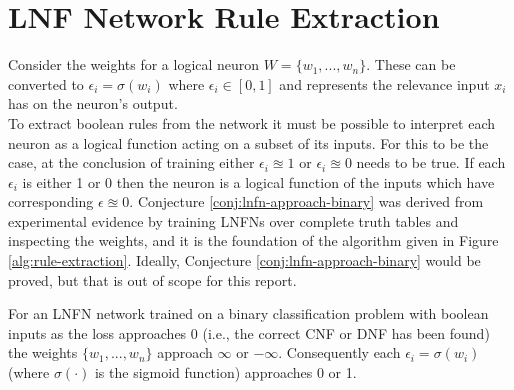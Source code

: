 \section{LNF Network Rule Extraction} \label{sec:lnfn-rule-extraction}
Consider the weights for a logical neuron $W = \{w_1, ..., w_n\}$. These can be converted to $\epsilon_i = \sigma(w_i)$ where $\epsilon_i \in [0, 1]$ and represents the relevance input $x_i$ has on the neuron's output.\\

To extract boolean rules from the network it must be possible to interpret each neuron as a logical function acting on a subset of its inputs. For this to be the case, at the conclusion of training either $\epsilon_i \approxeq 1$ or $\epsilon_i \approxeq 0$ needs to be true. If each $\epsilon_i$ is either 1 or 0 then the neuron is a logical function of the inputs which have corresponding $\epsilon \approxeq 0$. Conjecture \ref{conj:lnfn-approach-binary} was derived from experimental evidence by training LNFNs over complete truth tables and inspecting the weights, and it is the foundation of the algorithm given in Figure \ref{alg:rule-extraction}. Ideally, Conjecture \ref{conj:lnfn-approach-binary} would be proved, but that is out of scope for this report.

\begin{conjecture}
	For an LNFN network trained on a binary classification problem with boolean inputs as the loss approaches 0  (i.e., the correct CNF or DNF has been found) the weights $\{ w_1, ..., w_n \}$ approach $\infty$ or $-\infty$. Consequently each $\epsilon_i = \sigma(w_i)$ (where $\sigma(\cdot)$ is the sigmoid function) approaches 0 or 1.
	\label{conj:lnfn-approach-binary}
\end{conjecture}

